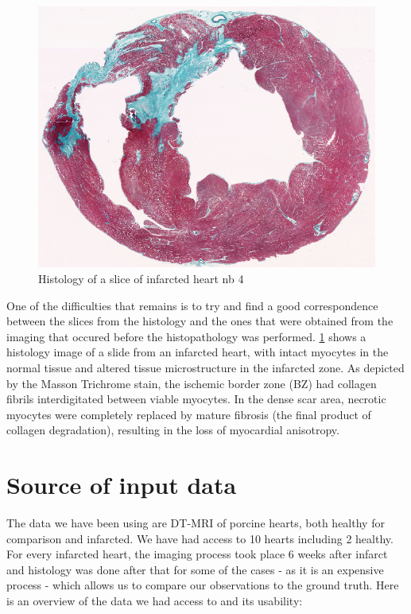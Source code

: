 \begin{figure}[h!]
    \centering
    \includegraphics[width=\textwidth]{figures/Gip4_histology}
    \caption{Histology of a slice of infarcted heart nb 4}
    \label{fig:histology_pig_4}
\end{figure}

One of the difficulties that remains is to try and find a good correspondence between the slices from the histology and the ones that were obtained from the imaging that occured before the histopathology was performed.  \ref{fig:histology_pig_4} shows a histology image of a slide from an infarcted heart, with intact myocytes in the normal tissue and altered tissue microstructure in the infarcted zone. As depicted by the Masson Trichrome stain, the ischemic border zone (BZ) had collagen fibrils interdigitated between viable myocytes. In the dense scar area, necrotic myocytes were completely replaced by mature fibrosis (the final product of collagen degradation), resulting in the loss of myocardial anisotropy.

\section{Source of input data}

The data we have been using are DT-MRI of porcine hearts, both healthy for comparison and infarcted. We have had access to 10 hearts including 2 healthy. For every infarcted heart, the imaging process took place 6 weeks after infarct and histology was done after that for some of the cases - as it is an expensive process - which allows us to compare our observations to the ground truth. Here is an overview of the data we had access to and its usability:

